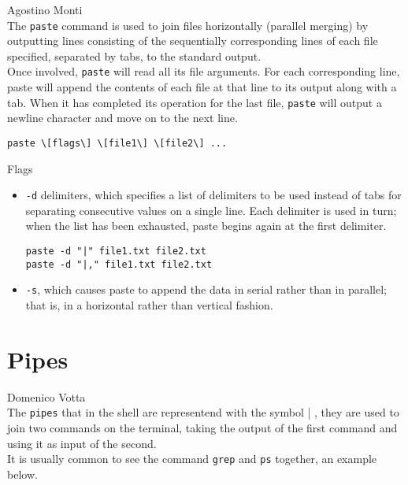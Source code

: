 \documentclass[hidelinks,12pt,a4paper,numbers=enddot]{scrartcl}
\begin{document}
\large Agostino Monti \normalsize\\



The \texttt{paste} command is used to join files horizontally
(parallel merging) by outputting lines consisting of the sequentially corresponding
lines of each file specified, separated by tabs, to the standard output.\\
Once involved, \texttt{paste} will read all its file arguments. For each corresponding line,
paste will append the contents of each file at that line to its output along with a tab.
When it has completed its operation for the last file, \texttt{paste} will output a newline
character and move on to the next line.

\begin{verbatim}
paste \[flags\] \[file1\] \[file2\] ...
\end{verbatim}

Flags

\begin{itemize}
    \item \texttt{-d} delimiters, which specifies a list of delimiters to be used instead of tabs
        for separating consecutive values on a single line. Each delimiter is used in turn;
        when the list has been exhausted, paste begins again at the first delimiter.
\begin{verbatim}
paste -d "|" file1.txt file2.txt
paste -d "|," file1.txt file2.txt\end{verbatim}
    
    \item \texttt{-s}, which causes paste to append the data in serial rather than in parallel;
        that is, in a horizontal rather than vertical fashion.
    
\end{itemize}

\section{Pipes}


\large Domenico Votta \normalsize\\



The \texttt{pipes} that in the shell are representend with the symbol | ,
they are used to join two commands on the terminal, taking the output of the first
command and using it as input of the second.\\
It is usually common to see the command \texttt{grep} and \texttt{ps} together,
an example below.\\
\end{document}
